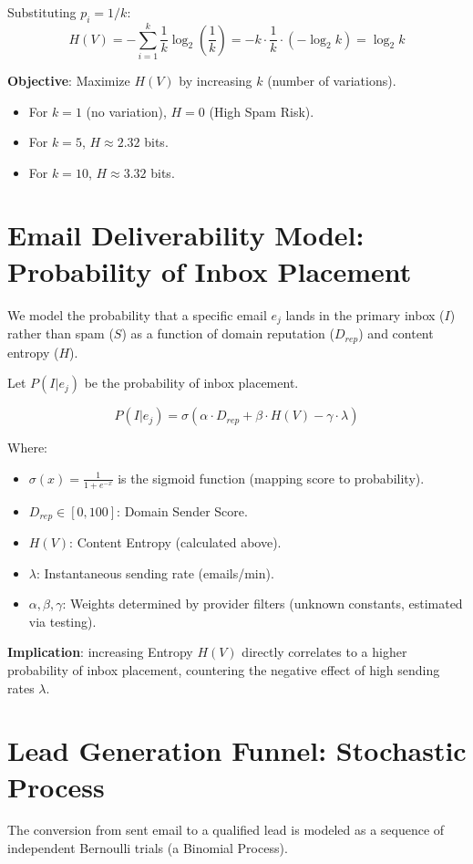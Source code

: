 \documentclass{article}
\begin{document}
Substituting $p_i = 1/k$:
\begin{equation}
    H(V) = -\sum_{i=1}^{k} \frac{1}{k} \log_2\left(\frac{1}{k}\right) = -k \cdot \frac{1}{k} \cdot (-\log_2 k) = \log_2 k
\end{equation}

\textbf{Objective}: Maximize $H(V)$ by increasing $k$ (number of variations).
\begin{itemize}
    \item For $k=1$ (no variation), $H = 0$ (High Spam Risk).
    \item For $k=5$, $H \approx 2.32$ bits.
    \item For $k=10$, $H \approx 3.32$ bits.
\end{itemize}

\section{Email Deliverability Model: Probability of Inbox Placement}
We model the probability that a specific email $e_j$ lands in the primary inbox ($I$) rather than spam ($S$) as a function of domain reputation ($D_{rep}$) and content entropy ($H$).

Let $P(I | e_j)$ be the probability of inbox placement.

\begin{equation}
    P(I | e_j) = \sigma \left( \alpha \cdot D_{rep} + \beta \cdot H(V) - \gamma \cdot \lambda \right)
\end{equation}

Where:
\begin{itemize}
    \item $\sigma(x) = \frac{1}{1 + e^{-x}}$ is the sigmoid function (mapping score to probability).
    \item $D_{rep} \in [0, 100]$: Domain Sender Score.
    \item $H(V)$: Content Entropy (calculated above).
    \item $\lambda$: Instantaneous sending rate (emails/min).
    \item $\alpha, \beta, \gamma$: Weights determined by provider filters (unknown constants, estimated via testing).
\end{itemize}

\textbf{Implication}: increasing Entropy $H(V)$ directly correlates to a higher probability of inbox placement, countering the negative effect of high sending rates $\lambda$.

\section{Lead Generation Funnel: Stochastic Process}
The conversion from sent email to a qualified lead is modeled as a sequence of independent Bernoulli trials (a Binomial Process).
\end{document}
